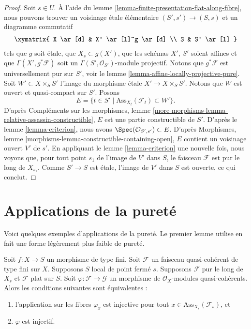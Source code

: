 \begin{proof}
Soit $s \in U$. À l'aide du
lemme \ref{lemma-finite-presentation-flat-along-fibre},
nous pouvons trouver un voisinage \'etale élémentaire
$(S', s') \to (S, s)$ et un diagramme commutatif
$$
\xymatrix{
X \ar[d] & X' \ar[l]^g \ar[d] \\
S & S' \ar[l]
}
$$
tels que $g$ soit \'etale, que $X_s \subset g(X')$, que les schémas
$X'$, $S'$ soient affines et que $\Gamma(X', g^*\mathcal{F})$
soit un $\Gamma(S', \mathcal{O}_{S'})$-module projectif.
Notons que $g^*\mathcal{F}$ est universellement pur sur $S'$, voir le
lemme \ref{lemma-affine-locally-projective-pure}.
Soit $W' \subset X \times_S S'$ l'image du morphisme \'etale
$X' \to X \times_S S'$. Notons que $W$ est ouvert et quasi-compact sur
$S'$. Posons
$$
E = \{t \in S' \mid \text{Ass}_{X_t}(\mathcal{F}_t) \subset W' \}.
$$
D'après
Compléments sur les morphismes,
lemme \ref{more-morphisms-lemma-relative-assassin-constructible},
$E$ est une partie constructible de $S'$. D'après le
lemme \ref{lemma-criterion},
nous avons $\Spec(\mathcal{O}_{S', s'}) \subset E$.
D'après
Morphismes, lemme \ref{morphisms-lemma-constructible-containing-open},
$E$ contient un voisinage ouvert $V'$ de $s'$.
En appliquant le
lemme \ref{lemma-criterion}
une nouvelle fois, nous voyons que, pour tout point $s_1$ de l'image de $V'$ dans $S$,
le faisceau $\mathcal{F}$ est pur le long de $X_{s_1}$. Comme
$S' \to S$ est \'etale, l'image de $V'$ dans $S$ est ouverte, ce qui conclut.
\end{proof}


\section{Applications de la pureté}
\label{section-applications-purity}

\noindent
Voici quelques exemples d'applications de la pureté. Le premier lemme
utilise en fait une forme légèrement plus faible de pureté.

\begin{lemma}
\label{lemma-injectivity-map-source-flat-pure}
Soit $f : X \to S$ un morphisme de type fini.
Soit $\mathcal{F}$ un faisceau quasi-cohérent de type fini sur $X$.
Supposons $S$ local de point fermé $s$.
Supposons $\mathcal{F}$ pur le long de $X_s$ et
$\mathcal{F}$ plat sur $S$.
Soit $\varphi : \mathcal{F} \to \mathcal{G}$ un morphisme de
$\mathcal{O}_X$-modules quasi-cohérents. Alors les conditions suivantes sont équivalentes :
\begin{enumerate}
\item l'application sur les fibres $\varphi_x$ est injective pour tout
$x \in \text{Ass}_{X_s}(\mathcal{F}_s)$, et
\item $\varphi$ est injectif.
\end{enumerate}
\end{lemma}

